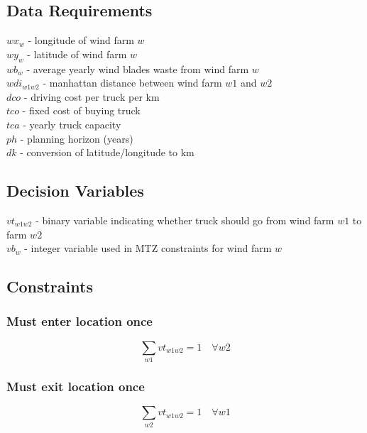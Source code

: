 \documentclass[11pt, oneside]{article}   	%
\begin{document}
\subsection*{Data Requirements}
$wx_{w}$ - longitude of wind farm $w$ \\
$wy_{w}$ - latitude of wind farm $w$ \\
$wb_{w}$ - average yearly wind blades waste from wind farm $w$ \\ 
$wdi_{w1w2}$ - manhattan distance between wind farm $w1$ and $w2$  \\

$dco$ - driving cost per truck per km \\ 
$tco$ - fixed cost of buying truck \\ 
$tca$ - yearly truck capacity \\
$ph$ - planning horizon (years) \\
$dk$ - conversion of latitude/longitude to km


\subsection*{Decision Variables} 
$vt_{w1w2}$ - binary variable indicating whether truck should go from wind farm $w1$ to farm $w2$ \\
$vb_{w}$ - integer variable used in MTZ constraints for wind farm $w$ 


\subsection*{Constraints}


\subsubsection*{Must enter location once}
\begin{equation}
	\sum_{w1} vt_{w1w2} = 1 \quad \forall w2
\end{equation}

\subsubsection*{Must exit location once}
\begin{equation}
	\sum_{w2} vt_{w1w2} = 1 \quad \forall w1
\end{equation}
\end{document}

